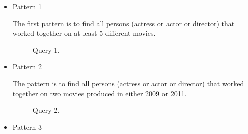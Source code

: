 \begin{itemize}

\item Pattern 1

The first pattern is to find all persons (actress or actor or director) that worked together on at least 5 different movies.

\begin{figure}[t]
\centering
{}
\caption{Query 1.}
\label{fig:query1}
\centering
\end{figure}

\item Pattern 2

The pattern is to find all persons (actress or actor or director) that worked together on two movies produced in either 2009 or 2011.

\begin{figure}[t]
\centering
{}
\caption{Query 2.}
\label{fig:query2}
\centering
\end{figure}

\item Pattern 3


\end{itemize}
